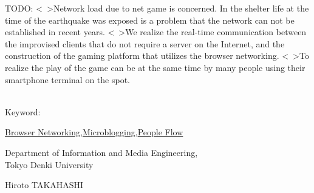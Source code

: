 TODO: 
<\ >Network load due to net game is concerned. In the shelter life at the time of the earthquake was exposed is a problem that the network can not be established in recent years.
<\ >We realize the real-time communication between the improvised clients that do not require a server on the Internet, and the construction of the gaming platform that utilizes the browser networking.
<\ >To realize the play of the game can be at the same time by many people using their smartphone terminal on the spot.
\\\\

\begin{flushleft}Keyword:\\
\end{flushleft}
{\underline{Browser Networking},\underline{Microblogging},\underline{People Flow}}

\begin{flushright}
\vspace{10mm}

\vspace{5mm}
\large Department of Information and Media Engineering,\\
Tokyo Denki University\\
\begin{flushright}\LARGE Hiroto TAKAHASHI\\
\end{flushright}

\end{flushright}
